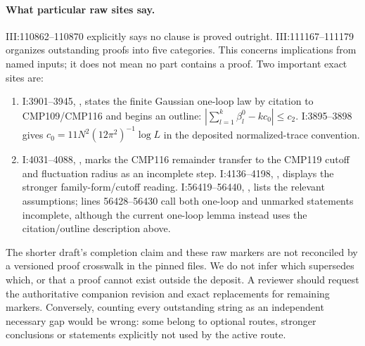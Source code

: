 \paragraph{What particular raw sites say.}
III:110862--110870 explicitly says no clause is proved
outright. III:111167--111179 organizes outstanding proofs
into five categories. This concerns implications from
named inputs; it does not mean no part contains a proof.
Two important exact sites are:
\begin{enumerate}
\item I:3901--3945, , states
the finite Gaussian one-loop law by citation to
CMP109/CMP116 and begins an outline:
\(\left|\sum_{l=1}^k\beta_l^0-kc_0\right|\leq c_2\).
I:3895--3898 gives \(c_0=11N^2(12\pi^2)^{-1}\log L\)
in the deposited normalized-trace convention.
\item I:4031--4088, , marks
the CMP116 remainder transfer to the CMP119 cutoff
and fluctuation radius as an incomplete step.
I:4136--4198, ,
displays the stronger family-form/cutoff reading.
I:56419--56440, ,
lists the relevant assumptions; lines 56428--56430
call both one-loop and unmarked statements incomplete,
although the current one-loop lemma instead uses
the citation/outline description above.
\end{enumerate}

The shorter draft's completion claim and these raw
markers are not reconciled by a versioned proof
crosswalk in the pinned files. We do not infer which
supersedes which, or that a proof cannot exist outside
the deposit. A reviewer should request the authoritative
companion revision and exact replacements for remaining
markers. Conversely, counting every outstanding string
as an independent necessary gap would be wrong: some
belong to optional routes, stronger conclusions or
statements explicitly not used by the active route.

